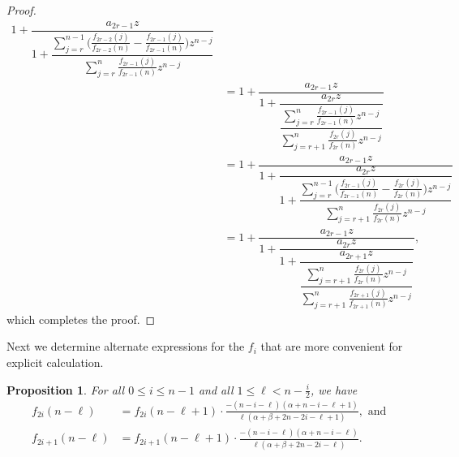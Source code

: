 \documentclass[10pt,a4paper]{amsart}
\newtheorem{prop}[equation]{Proposition}
\begin{document}
\begin{proof}
\begin{align*}
{1+\dfrac{a_{2r-1}z}{1+\dfrac{\sum_{j=r}^{n-1}\bigg(\frac{f_{2r-2}(j)}{f_{2r-2}(n)}-\frac{f_{2r-1}(j)}{f_{2r-1}(n)}\bigg)z^{n-j}}{\sum_{j=r}^n\frac{f_{2r-1}(j)}{f_{2r-1}(n)}z^{n-j}}}} \\
&={1+\dfrac{a_{2r-1}z}{1+\dfrac{a_{2r}z}{\dfrac{\sum_{j=r}^n\frac{f_{2r-1}(j)}{f_{2r-1}(n)}z^{n-j}}{\sum_{j=r+1}^{n}\frac{f_{2r}(j)}{f_{2r}(n)}z^{n-j}}}}} \\
&={1+\dfrac{a_{2r-1}z}{1+\dfrac{a_{2r}z}{1+\dfrac{\sum_{j=r}^{n-1}\big(\frac{f_{2r-1}(j)}{f_{2r-1}(n)}-\frac{f_{2r}(j)}{f_{2r}(n)}\big)z^{n-j}}{\sum_{j=r+1}^{n}\frac{f_{2r}(j)}{f_{2r}(n)}z^{n-j}}}}}\\
&={1+\dfrac{a_{2r-1}z}{1+\dfrac{a_{2r}z}{1+\dfrac{a_{2r+1}z}{\dfrac{\sum_{j=r+1}^{n}\frac{f_{2r}(j)}{f_{2r}(n)}z^{n-j}}{\sum_{j=r+1}^{n}\frac{f_{2r+1}(j)}{f_{2r+1}(n)}z^{n-j}}}}}},
\end{align*}
which completes the proof.
\end{proof}

Next we determine alternate expressions for the $f_i$ that are more convenient for explicit calculation.

\begin{prop} \label{f(n-l)_prop}
For all $0\le i\le n-1$ and all $1\le \ell<n-\frac{i}{2}$, we have
\begin{align*}
    f_{2i}(n-\ell)&=f_{2i}(n-\ell+1)\cdot\frac{-(n-i-\ell)(\alpha+n-i-\ell+1)}{\ell(\alpha+\beta+2n-2i-\ell+1)}, \text{ and } \\
    f_{2i+1}(n-\ell)&=f_{2i+1}(n-\ell+1)\cdot\frac{-(n-i-\ell)(\alpha+n-i-\ell)}{\ell(\alpha+\beta+2n-2i-\ell)}.
\end{align*}    
\end{prop}
\end{document}
